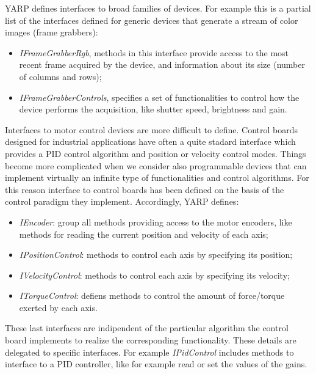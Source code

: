 YARP defines interfaces to broad families of devices. For 
example this is a partial list of the interfaces defined for generic 
devices that generate a stream of color images (frame grabbers):

\begin{itemize}

\item \emph{IFrameGrabberRgb}, methods in this interface 
provide access to the most recent frame acquired by the device, and 
information about its size (number of columns and rows);

\item \emph{IFrameGrabberControls}, specifies a set of functionalities 
to control how the device performs the acquisition, like shutter speed, 
brightness and gain.

\end{itemize}

Interfaces to motor control devices are more difficult to define. Control 
boards designed for industrial applications have often a quite stadard 
interface which provides a PID control algorithm and position or velocity 
control modes. Things become more complicated when we consider also 
programmable devices that can implement virtually an infinite type of 
functionalities and control algorithms. 
For this reason interface to control boards has been defined on the basis 
of the control paradigm they implement. Accordingly, YARP defines:

\begin{itemize}

\item \emph{IEncoder}: group all methods providing access to the motor 
encoders, like methods for reading the current position and velocity of 
each axis;

\item \emph{IPositionControl}: methods to control each axis 
by specifying its position;

\item \emph{IVelocityControl}: methods to control each axis 
by specifying its velocity;

\item \emph{ITorqueControl}: defiens methods to control the amount of 
force/torque exerted by each axis.

\end{itemize}

These last interfaces are indipendent of the particular algorithm the 
control board implements to realize the corresponding functionality. 
These details are delegated to specific interfaces. For example 
\emph{IPidControl} includes methods to interface to a PID controller, 
like for example read or set the values of the gains.


